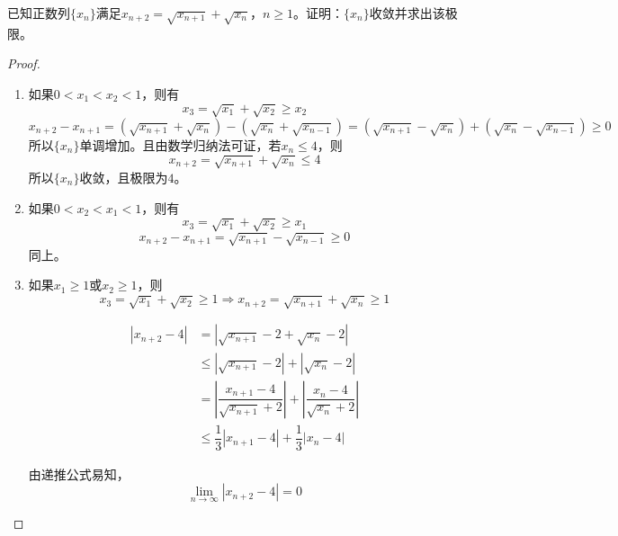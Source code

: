 \begin{proposition}
    
    已知正数列$\{x_n\}$满足$x_{n + 2} = \sqrt{x_{n + 1}} + \sqrt{x_{n}}$，$n \geq 1$。证明：$\{x_n\}$收敛并求出该极限。

\end{proposition}

\begin{proof}

    \begin{enumerate}

        \item 
            如果$0 < x_1 < x_2 < 1$，则有
            $$x_3 = \sqrt{x_1} + \sqrt{x_2} \geq x_2$$
            $$x_{n + 2} - x_{n + 1} = (\sqrt{x_{n + 1}} + \sqrt{x_{n}}) - (\sqrt{x_{n}} + \sqrt{x_{n - 1}}) = (\sqrt{x_{n + 1}} - \sqrt{x_{n}}) + (\sqrt{x_{n}} - \sqrt{x_{n - 1}}) \geq 0$$
            所以$\{x_n\}$单调增加。且由数学归纳法可证，若$x_n \leq 4$，则
            $$x_{n + 2} = \sqrt{x_{n + 1}} + \sqrt{x_{n}} \leq 4$$
            所以$\{x_n\}$收敛，且极限为$4$。

        \item 
            如果$0 < x_2 < x_1 < 1$，则有
            $$x_3 = \sqrt{x_1} + \sqrt{x_2} \geq x_1$$
            $$x_{n + 2} - x_{n + 1} = \sqrt{x_{n + 1}} - \sqrt{x_{n - 1}} \geq 0$$
            同上。

        \item 
            如果$x_1 \geq 1$或$x_2 \geq 1$，则
            $$x_3 = \sqrt{x_1} + \sqrt{x_2} \geq 1 \Longrightarrow x_{n + 2} = \sqrt{x_{n + 1}} + \sqrt{x_{n}} \geq 1$$
            
            \begin{align*}
                |x_{n + 2} - 4| & = |\sqrt{x_{n + 1}} - 2 + \sqrt{x_{n}} - 2| \\
                & \leq |\sqrt{x_{n + 1}} - 2| + |\sqrt{x_{n}} - 2| \\
                & = \left| \dfrac{x_{n + 1} - 4}{\sqrt{x_{n + 1}} + 2} \right| + \left| \dfrac{x_{n} - 4}{\sqrt{x_{n}} + 2} \right| \\
                & \leq \dfrac{1}{3} |x_{n + 1} - 4| + \dfrac{1}{3}|x_n - 4| 
            \end{align*}

            由递推公式易知，
            $$\lim\limits_{n \to \infty}{|x_{n + 2} - 4|} = 0$$

    \end{enumerate}

\end{proof}

